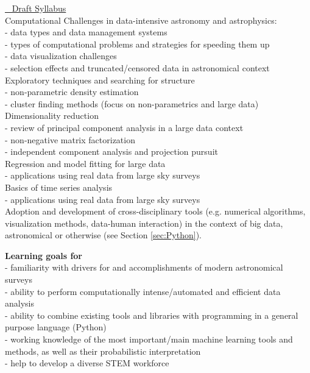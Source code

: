 \item \underline{\astrocl~ Draft Syllabus}\\

Computational Challenges in data-intensive astronomy and astrophysics: \\
- data types and data management systems \\
- types of computational problems and strategies for speeding them up \\
- data visualization challenges \\
- selection effects and truncated/censored data in astronomical context \\

Exploratory techniques and searching for structure \\
- non-parametric density estimation \\
- cluster finding methods (focus on non-parametrics and large data) \\

Dimensionality reduction\\
- review of principal component analysis in a large data context \\
- non-negative matrix factorization  \\
- independent component analysis and projection pursuit \\

Regression and model fitting for large data \\
- applications using real data from large sky surveys \\

Basics of time series analysis \\
- applications using real data from large sky surveys \\

Adoption and development of cross-disciplinary tools (e.g. numerical 
algorithms, visualization methods, data-human interaction) in the context
of big data, astronomical or otherwise (see Section \ref{sec:Python}).
\eit

{\bf Learning goals for \astrocl} \\
- familiarity with drivers for and accomplishments of modern astronomical surveys\\
- ability to perform computationally intense/automated and efficient data analysis\\
- ability to combine existing tools and libraries with programming in a general purpose language (Python)\\
- working knowledge of the most important/main machine learning tools and \\
   methods, as well as their probabilistic interpretation \\
- help to develop a diverse STEM workforce \\
 



